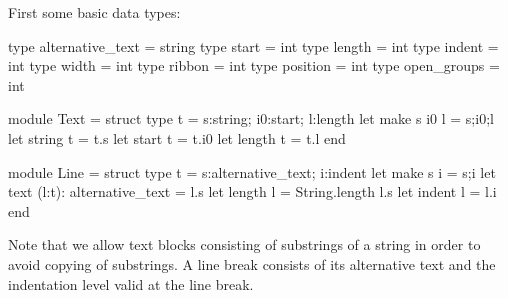 \documentclass[12pt]{article}
\begin{document}
First some basic data types:
\begin{ocaml}
  type alternative_text = string
  type start = int
  type length = int
  type indent = int
  type width  = int
  type ribbon = int
  type position = int
  type open_groups = int

  module Text =
    struct
      type t = {s:string; i0:start; l:length}
      let make s i0 l = {s;i0;l}
      let string t = t.s
      let start t = t.i0
      let length t = t.l
    end

  module Line =
    struct
      type t = {s:alternative_text; i:indent}
      let make s i = {s;i}
      let text (l:t): alternative_text = l.s
      let length l = String.length l.s
      let indent l = l.i
    end
\end{ocaml}
%
Note that we allow text blocks consisting of substrings of a string in order
to avoid copying of substrings. A line break consists of its alternative text
and the indentation level valid at the line break.
\end{document}

